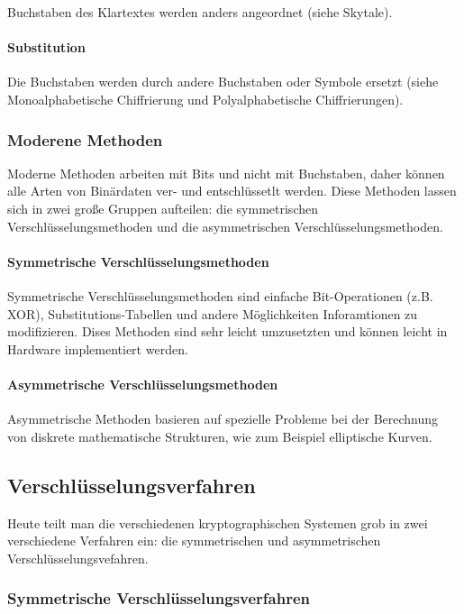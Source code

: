 \documentclass[12pt,a4paper]{report}
\begin{document}
Buchstaben des Klartextes werden anders angeordnet (siehe Skytale).

\paragraph{Substitution}

Die Buchstaben werden durch andere Buchstaben oder Symbole ersetzt (siehe Monoalphabetische Chiffrierung und Polyalphabetische Chiffrierungen).

\subsubsection{Moderene Methoden}

Moderne Methoden arbeiten mit Bits und nicht mit Buchstaben, daher können alle Arten von Binärdaten ver- und entschlüssetlt werden. Diese Methoden lassen sich in zwei große Gruppen aufteilen: die symmetrischen Verschlüsselungsmethoden und die asymmetrischen Verschlüsselungsmethoden.

\paragraph{Symmetrische Verschlüsselungsmethoden}

Symmetrische Verschlüsselungsmethoden sind einfache Bit-Operationen (z.B. XOR), Substitutions-Tabellen und andere Möglichkeiten Inforamtionen zu modifizieren. Dises Methoden sind sehr leicht umzusetzten und können leicht in Hardware implementiert werden.

\paragraph{Asymmetrische Verschlüsselungsmethoden} 

Asymmetrische Methoden basieren auf spezielle Probleme bei der Berechnung von diskrete mathematische Strukturen, wie zum Beispiel elliptische Kurven.

\subsection{Verschlüsselungsverfahren}

Heute teilt man die verschiedenen kryptographischen Systemen grob in zwei verschiedene Verfahren ein: die symmetrischen und asymmetrischen Verschlüsselungsvefahren.

\subsubsection{Symmetrische Verschlüsselungsverfahren}
\end{document}
